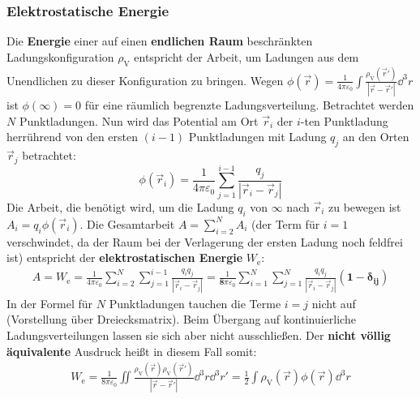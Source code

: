 	  \subsubsection{Elektrostatische Energie}
		  Die \textbf{Energie} einer auf einen \textbf{endlichen Raum} beschränkten
		  Ladungskonfiguration $\rho_\text{V}$ entspricht der Arbeit, um
		  Ladungen aus dem Unendlichen zu dieser Konfiguration zu bringen. Wegen $\phi(\vec{r} ) =
			  \frac{1}{4\pi\varepsilon_0}\int\frac{\rho_\text{V}(\vec{r}' )}{\left|\vec{r} -\vec{r}' \right|}
			  \dd^3r$ ist \textbf{$\phi(\infty) = 0$} für eine räumlich begrenzte Ladungsverteilung.
			  Betrachtet werden $N$ Punktladungen. Nun wird das Potential am Ort $\vec{r} _i$ der $i$-ten Punktladung herrührend von den ersten $(i-1)$ Punktladungen mit Ladung $q_j$ an den Orten $\vec{r} _j$ betrachtet:
			        $$
				        \phi(\vec{r} _i) = \frac{1}{4\pi\varepsilon_0} \sum_{j=1}^{i-1}
				        \frac{q_j}{|\vec{r} _i - \vec{r} _j|}
			        $$
			       Die Arbeit, die benötigt wird, um die Ladung $q_i$ von $\infty$ nach $\vec{r} _i$ zu bewegen ist $A_i = q_i\phi(\vec{r} _i)$.
			        Die Gesamtarbeit $A = \sum_{i=2}^N A_i$ (der Term für $i=1$
			        verschwindet, da der Raum bei der Verlagerung der ersten Ladung
			        noch feldfrei ist) entspricht der \textbf{elektrostatischen
				        Energie} $W_\text{e}$:
			        \begin{equation}\begin{split}A = W_\text{e} = \frac{1}{4\pi\varepsilon_0} \sum_{i=2}^N \sum_{j=1}^{i-1}
					        \frac{q_i q_j}{|\vec{r} _i - \vec{r} _j|} = \frac{1}{\bm{8}\pi\varepsilon_0} \sum_{i=1}^N \sum_{j=1}^{N}
					        \frac{q_i q_j}{|\vec{r} _i - \vec{r} _j|} \bm{(1-\delta_{ij})}
				        \end{split}\end{equation}
			   In der Formel für $N$ Punktladungen tauchen die Terme $i=j$ nicht auf (Vorstellung über Dreiecksmatrix). Beim Übergang auf kontinuierliche Ladungsverteilungen
			        lassen sie sich aber nicht ausschließen. Der \textbf{nicht
				        völlig äquivalente} Ausdruck heißt in diesem Fall somit:
			        \begin{equation}\label{elstatE}\begin{split}
					        \boxed{ W_\text{e} = \frac{1}{8\pi\varepsilon_0} \iint
						        \frac{\rho_\text{V}(\vec{r} ) \rho_\text{V}(\vec{r}' )}{|\vec{r} -
							        \vec{r}' |} \dd^3 r\dd^3 r' = \frac{1}{2} \int
						        \rho_\text{V}(\vec{r} )\phi(\vec{r} ) \dd^3 r}
				        \end{split}\end{equation}
